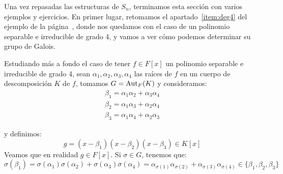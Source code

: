 \noindent
Una vez repasadas las estructuras de $S_n$, terminamos esta sección con varios ejemplos y ejercicios. En primer lugar, retomamos el apartado~\ref{item:deg4} del ejemplo de la página~\pageref{ej:grupos_galois}, donde nos quedamos con el caso de un polinomio separable e irreducible de grado 4, y vamos a ver cómo podemos determinar su grupo de Galois.
\begin{ejemplo}\label{ejemplo:resolvente_cubica}
    Estudiando más a fondo el caso de tener $f\in F[x]$ un polinomio separable e irreducible de grado 4, sean $\alpha_1,\alpha_2,\alpha_3,\alpha_4$ las raíces de $f$ en un cuerpo de descomposición $K$ de $f$, tomamos $G=\operatorname{Aut}_F(K)$ y consideramos:
    \begin{align*}
        \beta_1 = \alpha_1\alpha_2 + \alpha_3 \alpha_4 \\
        \beta_2 = \alpha_1\alpha_3 + \alpha_2 \alpha_4 \\
        \beta_3 = \alpha_1\alpha_4 + \alpha_2 \alpha_3 
    \end{align*}

    y definimos:
    \begin{equation*}
        g = (x-\beta_1)(x-\beta_2)(x-\beta_3)\in K[x]
    \end{equation*}
    Veamos que en realidad $g\in F[x]$. Si $\sigma\in G$, tenemos que:
    \begin{equation*}
        \sigma(\beta_1) = \sigma(\alpha_1)\sigma(\alpha_2) + \sigma(\alpha_3)\sigma(\alpha_4) = \alpha_{\sigma(1)}\alpha_{\sigma(2)} + \alpha_{\sigma(3)}\alpha_{\sigma(4)} \in \{\beta_1,\beta_2,\beta_3\}
    \end{equation*}


\end{ejemplo}
